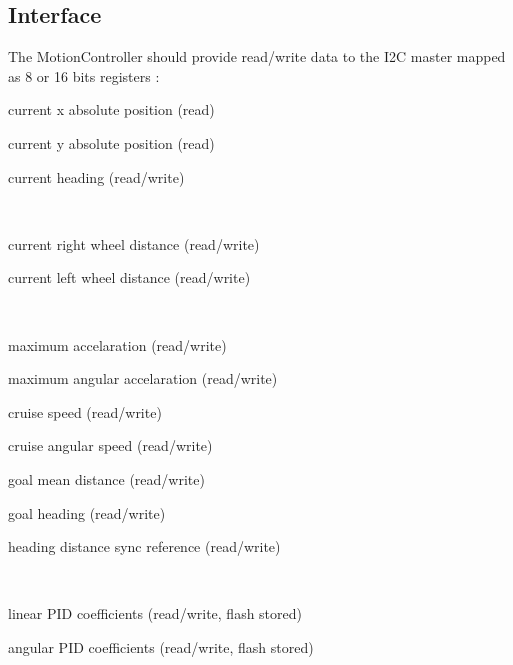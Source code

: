 \subsection*{Interface}

The Motion\+Controller should provide read/write data to the I2C master mapped as 8 or 16 bits registers \+:


\begin{DoxyItemize}
\item current x absolute position (read)
\item current y absolute position (read)
\item current heading (read/write)
\end{DoxyItemize}

~\newline



\begin{DoxyItemize}
\item current right wheel distance (read/write)
\item current left wheel distance (read/write)
\end{DoxyItemize}

~\newline



\begin{DoxyItemize}
\item maximum accelaration (read/write)
\item maximum angular accelaration (read/write)
\item cruise speed (read/write)
\item cruise angular speed (read/write)
\item goal mean distance (read/write)
\item goal heading (read/write)
\item heading distance sync reference (read/write)~\newline

\end{DoxyItemize}

~\newline



\begin{DoxyItemize}
\item linear P\+ID coefficients (read/write, flash stored)
\item angular P\+ID coefficients (read/write, flash stored)
\end{DoxyItemize}

